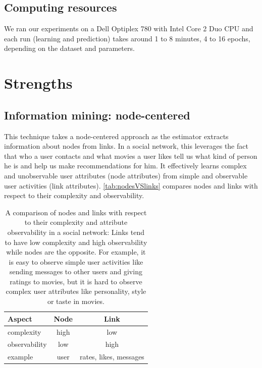 \documentclass{article}
\begin{document}
\subsection{Computing resources}
We ran our experiments on a Dell Optiplex 780 with Intel Core 2 Duo CPU and 
each run (learning and prediction) takes around 1 to 8 minutes, 4 to 16 epochs, 
depending on the dataset and parameters.

\section{Strengths}

\subsection{Information mining: node-centered}
This technique takes a node-centered approach as the estimator extracts 
information about nodes from links.
In a social network, this leverages the fact that who a user contacts and what 
movies a user likes tell us what kind of person he is and help us make 
recommendations for him.
It effectively learns complex and unobservable user attributes (node 
attributes) from simple and observable user activities (link attributes). 
\autoref{tab:nodesVSlinks} compares nodes and links with respect to their 
complexity and observability.
\begin{table}[h]
	\centering
	\caption{A comparison of nodes and links with respect to their complexity 
		and attribute observability in a social network:
		Links tend to have low complexity and high observability while nodes 
		are the opposite.
		For example, it is easy to observe simple user activities like sending 
		messages to other users and giving ratings to movies,
		but it is hard to observe complex user attributes like personality, 
		style or taste in movies.}
	\begin{tabularx}{0.5\textwidth}{ |X|c|c| } \hline
		\textbf{Aspect} & \textbf{Node} & \textbf{Link} \\ \hline
		complexity & high & low \\ \hline
		observability & low & high \\ \hline
		example & user & rates, likes, messages \\ \hline
	\end{tabularx}
	\label{tab:nodesVSlinks}
\end{table}
\end{document}
